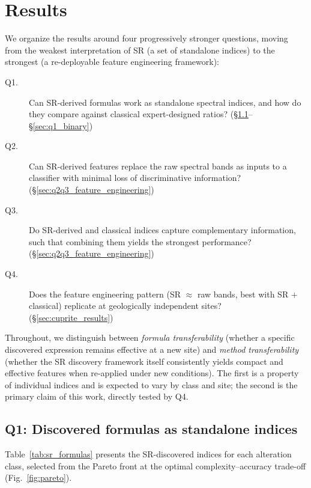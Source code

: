 \documentclass[preprint,authoryear,number]{elsarticle}
\begin{document}
\section{Results}
\label{sec:results}

We organize the results around four progressively stronger questions, moving from the weakest interpretation of SR (a set of standalone indices) to the strongest (a re-deployable feature engineering framework):

\begin{description}
  \item[Q1.] Can SR-derived formulas work as standalone spectral indices, and how do they compare against classical expert-designed ratios? (\S\ref{sec:q1_standalone_discovered}--\S\ref{sec:q1_binary})
  \item[Q2.] Can SR-derived features replace the raw spectral bands as inputs to a classifier with minimal loss of discriminative information? (\S\ref{sec:q2q3_feature_engineering})
  \item[Q3.] Do SR-derived and classical indices capture complementary information, such that combining them yields the strongest performance? (\S\ref{sec:q2q3_feature_engineering})
  \item[Q4.] Does the feature engineering pattern (SR $\approx$ raw bands, best with SR $+$ classical) replicate at geologically independent sites? (\S\ref{sec:cuprite_results})
\end{description}

Throughout, we distinguish between \emph{formula transferability} (whether a specific discovered expression remains effective at a new site) and \emph{method transferability} (whether the SR discovery framework itself consistently yields compact and effective features when re-applied under new conditions). The first is a property of individual indices and is expected to vary by class and site; the second is the primary claim of this work, directly tested by Q4.

\subsection{Q1: Discovered formulas as standalone indices}
\label{sec:q1_standalone_discovered}

Table~\ref{tab:sr_formulas} presents the SR-discovered indices for each alteration class, selected from the Pareto front at the optimal complexity--accuracy trade-off (Fig.~\ref{fig:pareto}).
\end{document}
